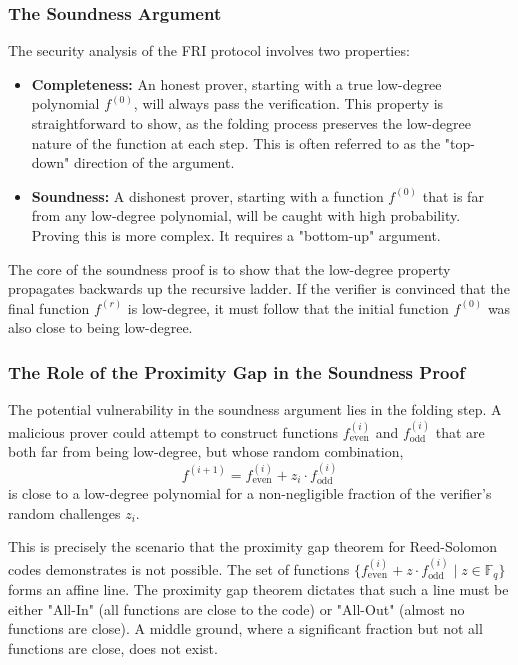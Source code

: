 \documentclass{article}
\begin{document}
\subsubsection{The Soundness Argument}
The security analysis of the FRI protocol involves two properties:
\begin{itemize}
    \item \textbf{Completeness:} An honest prover, starting with a true low-degree polynomial $f^{(0)}$, will always pass the verification. This property is straightforward to show, as the folding process preserves the low-degree nature of the function at each step. This is often referred to as the "top-down" direction of the argument.
    \item \textbf{Soundness:} A dishonest prover, starting with a function $f^{(0)}$ that is far from any low-degree polynomial, will be caught with high probability. Proving this is more complex. It requires a "bottom-up" argument.
\end{itemize}
The core of the soundness proof is to show that the low-degree property propagates backwards up the recursive ladder. If the verifier is convinced that the final function $f^{(r)}$ is low-degree, it must follow that the initial function $f^{(0)}$ was also close to being low-degree.

\subsubsection{The Role of the Proximity Gap in the Soundness Proof}
The potential vulnerability in the soundness argument lies in the folding step. A malicious prover could attempt to construct functions $f^{(i)}_{\text{even}}$ and $f^{(i)}_{\text{odd}}$ that are both far from being low-degree, but whose random combination,
\[ f^{(i+1)} = f^{(i)}_{\text{even}} + z_i \cdot f^{(i)}_{\text{odd}} \]
is close to a low-degree polynomial for a non-negligible fraction of the verifier's random challenges $z_i$.

This is precisely the scenario that the proximity gap theorem for Reed-Solomon codes demonstrates is not possible. The set of functions $\{ f^{(i)}_{\text{even}} + z \cdot f^{(i)}_{\text{odd}} \mid z \in \mathbb{F}_q \}$ forms an affine line. The proximity gap theorem dictates that such a line must be either "All-In" (all functions are close to the code) or "All-Out" (almost no functions are close). A middle ground, where a significant fraction but not all functions are close, does not exist.
\end{document}
